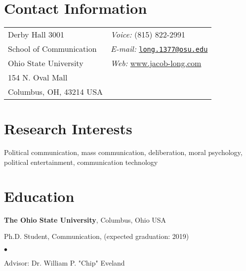 \documentclass[margin,line]{res}
\newenvironment{list1}{
  \begin{list}{\ding{113}}{%
      \setlength{\itemsep}{0in}
      \setlength{\parsep}{0in} \setlength{\parskip}{0in}
      \setlength{\topsep}{0in} \setlength{\partopsep}{0in} 
      \setlength{\leftmargin}{0.17in}}}{\end{list}}
\newenvironment{list2}{
  \begin{list}{$\bullet$}{%
      \setlength{\itemsep}{0in}
      \setlength{\parsep}{0in} \setlength{\parskip}{0in}
      \setlength{\topsep}{0in} \setlength{\partopsep}{0in} 
      \setlength{\leftmargin}{0.2in}}}{\end{list}}
\begin{document}

\begin{resume}
\section{\sc Contact Information}
\vspace{.05in}
\begin{tabular}{@{}p{2in}p{4in}}
Derby Hall 3001           & {\it Voice:}  (815) 822-2991 \\            
School of Communication & {\it E-mail:}  \href{mailto:long.1377@osu.edu}{\nolinkurl{long.1377@osu.edu}}\\         
Ohio State University & {\it Web:} \url{www.jacob-long.com}\\ 
154 N. Oval Mall \\      
Columbus, OH, 43214 USA \\     
\end{tabular}


\section{\sc Research Interests}
Political communication, mass communication, deliberation, moral psychology, political entertainment, communication technology

\section{\sc Education}
{\bf The Ohio State University}, Columbus, Ohio USA\\
\vspace*{-.1in}
\begin{list1}
\item[] Ph.D. Student, Communication, (expected graduation: 2019)
\begin{list2}
\vspace*{.05in}
\item Advisor: Dr. William P. "Chip" Eveland
\end{list2}
\end{list1}


\end{resume}
\end{document}
